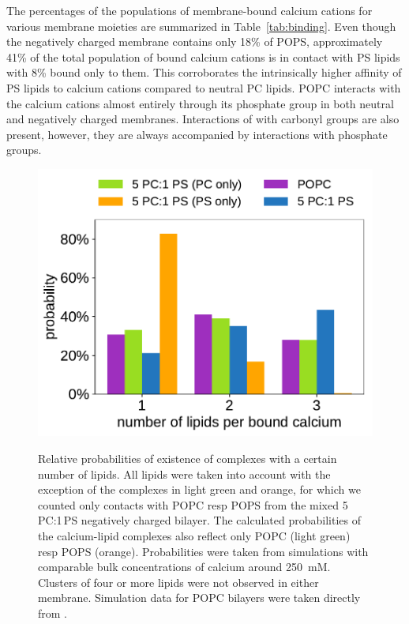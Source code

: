 \documentclass[journal=jpcbfk,manuscript=article]{achemso}
\newlength{\figwidth}
\begin{document}
The percentages of the populations of membrane-bound calcium cations for various membrane moieties 
are summarized in Table~\ref{tab:binding}.
Even though the negatively charged membrane contains only 18\% of POPS, 
approximately 41\% of the total population of bound calcium cations is in contact with PS lipids
with 8\% bound only to them. 
This corroborates the intrinsically higher affinity of PS lipids to calcium cations compared to neutral PC lipids. 
POPC interacts with the calcium cations almost entirely through its phosphate group 
in both neutral and negatively charged membranes. 
Interactions of  with carbonyl groups are also present, 
however, they are always accompanied by interactions with phosphate groups. 


\begin{figure}[tb!] 
  \centering 
  \includegraphics[width=\figwidth]{../img/stoichiometry_CaCl2_comparison_Ecc-lipids_PC-vs-PCPS.pdf} \\ 
  \caption{\label{fig:cacl_complexes} 
      Relative probabilities of existence of  complexes 
      with a certain number of lipids.  
      All lipids were taken into account with the exception of the complexes in light green and orange, 
      for which we counted only contacts with POPC resp POPS from the mixed 5\,PC:1\,PS negatively charged bilayer. 
      The calculated probabilities of the calcium-lipid complexes also reflect only POPC (light green) resp POPS (orange). 
      Probabilities were taken from simulations with comparable bulk concentrations of calcium around 250~mM. 
      Clusters of four or more lipids were not observed in either membrane. 
      Simulation data for POPC bilayers were taken directly from \cite{melcr18}. 
  } 
\end{figure} 
\end{document}
